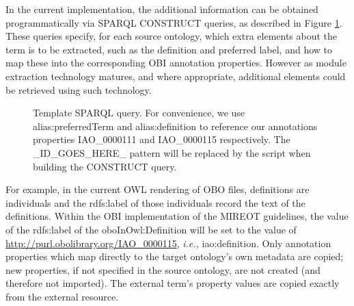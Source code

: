 \documentclass{ao2e}%
\begin{document}
In the current implementation, the additional information can be obtained programmatically via SPARQL \cite{SPARQL} CONSTRUCT queries, as described in Figure \ref{fig:sparql}.
These queries \cite{OBIQueries} specify, for each source ontology, which extra elements about the term is to be extracted, such as the definition and preferred label, and how to map these into the corresponding OBI annotation properties. However as module extraction technology matures, and where appropriate, additional elements could be retrieved using such technology.

\begin{figure}[t]
\scriptsize
 
\caption{Template SPARQL query. For convenience, we use alias:preferredTerm and
alias:definition to reference our annotations properties IAO\_0000111 and IAO\_0000115 \cite{IAO} respectively. The \_ID\_GOES\_HERE\_ pattern will be replaced by the script when building the CONSTRUCT query.}
\label{fig:sparql}
\end{figure}

For example, in the current \ac{OWL} rendering of \ac{OBO} files, definitions are individuals and the rdfs:label of those individuals record the text of the definitions. 
Within the \ac{OBI} implementation of the \ac{MIREOT} guidelines, the value of the rdfs:label of the oboInOwl:Definition will be set to the value of \url{http://purl.obolibrary.org/IAO_0000115}, \emph{i.e.,} iao:definition. Only annotation properties which map directly to the target ontology's own metadata are copied; new properties, if not specified in the source ontology, are not created (and therefore not imported). The external term's property values are copied exactly from the external resource.
\end{document}
